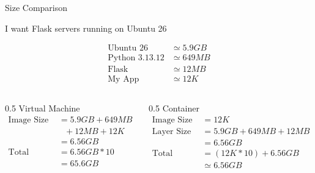 \documentclass{slide}
\begin{document}
\begin{frame}{Size Comparison}

    I want  Flask servers running on Ubuntu 26

    \normalsize
    \begin{align*}
        \text{Ubuntu 26} &\simeq 5.9GB \\
        \text{Python 3.13.12} &\simeq 649MB \\
        \text{Flask} &\simeq 12MB \\
        \text{My App} &\simeq 12K 
    \end{align*}

\begin{columns}
    \begin{column}{0.5\textwidth}
    {\color{primary} Virtual Machine}
    \begin{align*}
        \text{Image Size} &= 5.9GB + 649MB \\
                          &~~~+ 12MB + 12K\\
        &= 6.56GB \\
        \text{Total Space} &= 6.56GB * 10 \\
        &= 65.6GB
    \end{align*}
    \end{column}
    \begin{column}{0.5\textwidth}
    {\color{primary} Container}
    \begin{align*}
        \text{Image Size} &= 12K \\
        \text{Layer Size} &= 5.9GB + 649MB + 12MB \\
                             &= 6.56GB \\
        \text{Total Space} &= (12K * 10) + 6.56GB \\
                           &\simeq 6.56GB
    \end{align*}
    \end{column}
\end{columns}
\end{frame}


\end{document}
